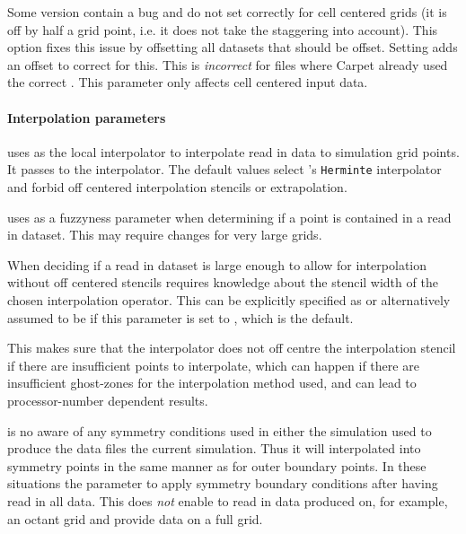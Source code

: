 Some  version contain a bug and do not set  correctly
for cell centered grids (it is off by half a grid point, i.e. it does not take
the staggering into account). This option fixes this issue by offsetting all
datasets that should be offset.  Setting 
adds an offset to correct for this. This is \emph{incorrect} for files where
Carpet already used the correct . This parameter only affects cell
centered input data.

\paragraph{Interpolation parameters}
 uses  as the local interpolator
to interpolate read in data to simulation grid points. It passes
 to the interpolator. The default values select
's \texttt{Herminte} interpolator and forbid off centered
interpolation stencils or extrapolation.

 uses  as a fuzzyness
parameter when determining if a point is contained in a read in dataset. This
may require changes for very large grids.

When deciding if a read in dataset is large enough to allow for interpolation
without off centered stencils  requires knowledge about
the stencil width of the chosen interpolation operator. This can be explicitly
specified as  or alternatively
assumed to be  if this parameter is set to ,
which is the default.

This makes sure that the interpolator does not  off centre the interpolation
stencil if there are insufficient points to interpolate, which can happen if
there are insufficient ghost-zones for the interpolation method used, and can
lead to processor-number dependent results.

 is no aware of any symmetry conditions used  in either
the simulation used to produce the data files the current simulation. Thus it
will interpolated into symmetry points in the same manner as for outer
boundary points. In these situations the parameter
 to apply symmetry boundary
conditions after having read in all data. This does \emph{not} enable
 to read in data produced on, for example, an octant
grid and provide data on a full grid.

